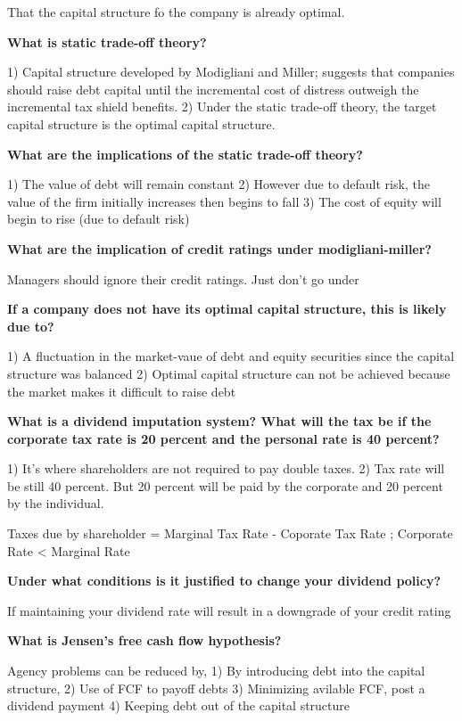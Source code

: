 \documentclass[12pt]{article}
\begin{document}
\begin{framed}
\begin{framed}
		 	That the capital structure fo the company is already optimal.
			
			\textbf{What is static trade-off theory?}
			
			1) Capital structure developed by Modigliani and Miller; suggests that companies should raise debt capital until the incremental cost of distress outweigh the incremental tax shield benefits. 
			2) Under the static trade-off theory, the target capital structure is the optimal capital structure. 
			
			\textbf{What are the implications of the static trade-off theory?}
			
			1) The value of debt will remain constant
			2) However due to default risk, the value of the firm initially increases then begins to fall
			3) The cost of equity will begin to rise (due to default risk)
			
			\textbf{What are the implication of credit ratings under modigliani-miller?}
			
			Managers should ignore their credit ratings. Just don't go under
			
		\end{framed}
			\textbf{If a company does not have its optimal capital structure, this is likely due to?}
			
			1) A fluctuation in the market-vaue of debt and equity securities since the capital structure was balanced
			2) Optimal capital structure can not be achieved because the market makes it difficult to raise debt
			
			\textbf{What is a dividend imputation system? What will the tax be if the corporate tax rate is 20 percent and the personal rate is 40 percent?}
			
			1) It's where shareholders are not required to pay double taxes. 
			2) Tax rate will be still 40 percent. But 20 percent will be paid by the corporate and 20 percent by the individual.
			
			
			Taxes due by shareholder = Marginal Tax Rate - Coporate Tax Rate ; Corporate Rate < Marginal Rate
			
			\textbf{Under what conditions is it justified to change your dividend policy?}
			
			If maintaining your dividend rate will result in a downgrade of your credit rating
			
			\textbf{What is Jensen's free cash flow hypothesis?}
			
			Agency problems can be reduced by, 
			1) By introducing debt into the capital structure, 
			2) Use of FCF to payoff debts
			3) Minimizing avilable FCF, post a dividend payment
			4) Keeping debt out of the capital structure
			

\end{framed}
\end{document}
